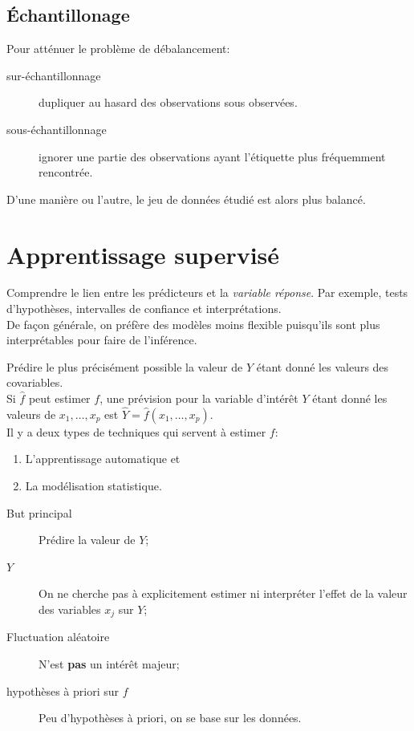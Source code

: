 \documentclass[10pt, french]{article}
\begin{document}
\begin{multicols*}{3}
\subsection*{Échantillonage}
Pour atténuer le problème de débalancement:
\begin{description}
	\item[sur-échantillonnage]	dupliquer au hasard des observations sous observées.
	\item[sous-échantillonnage]	ignorer une partie des observations ayant l'étiquette plus fréquemment rencontrée.
\end{description}
D'une manière ou l'autre, le jeu de données étudié est alors plus balancé.

\pagebreak

\section{Apprentissage supervisé}
\begin{definitionNOHFILL}[Inférence]
Comprendre le lien entre les prédicteurs et la \textit{variable réponse}. Par exemple, tests d'hypothèses, intervalles de confiance et interprétations.\\

De façon générale, on préfère des modèles moins flexible puisqu'ils sont plus interprétables pour  faire de l'inférence.
\end{definitionNOHFILL}

\begin{definitionNOHFILL}[Prévisions]
Prédire le plus précisément possible la valeur de $Y$ étant donné les valeurs des covariables.\\

Si $\hat{f}$ peut estimer $f$, une prévision pour la variable d'intérêt $Y$ étant donné les valeurs de $x_{1}, \dots, x_{p}$ est $\hat{Y} = \hat{f}(x_{1}, \dots, x_{p})$. \\

Il y a deux types de techniques qui servent à estimer $f$:
\begin{enumerate}
	\item	L'apprentissage automatique et
	\item	La modélisation statistique.
\end{enumerate}
\end{definitionNOHFILL}


\begin{definitionNOHFILLsub}
\begin{description}
	\item[But principal]	Prédire la valeur de $Y$;
	\item[$Y$]	On ne cherche pas à explicitement estimer ni interpréter l'effet de la valeur des variables $x_{j}$ sur $Y$;
	\item[Fluctuation aléatoire]	N'est \textbf{pas} un intérêt majeur;
	\item[hypothèses à priori sur $f$]	Peu d'hypothèses à priori, on se base sur les données.
\end{description}
\end{definitionNOHFILLsub}


\end{multicols*}
\end{document}
